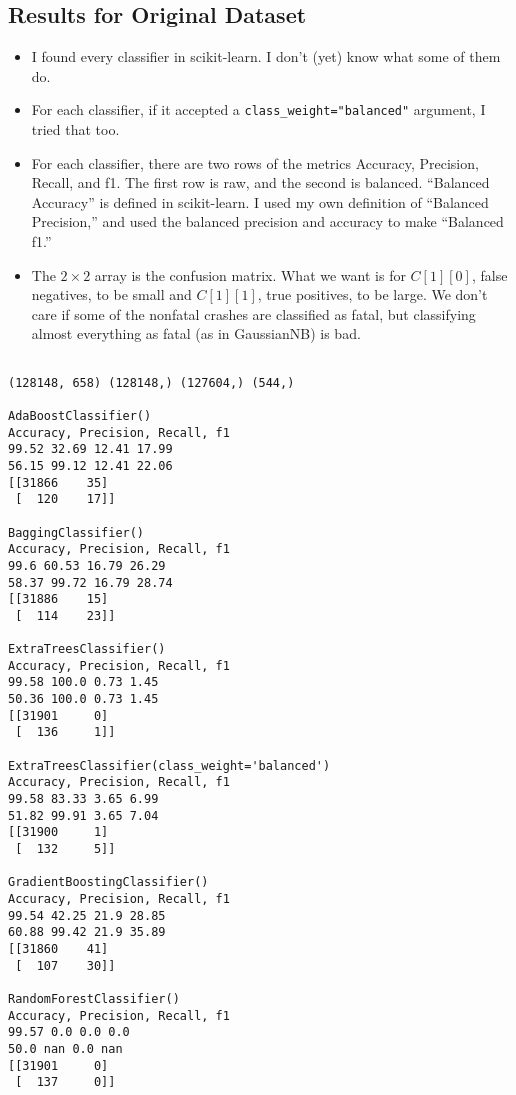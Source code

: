 \documentclass[11pt]{article}
\begin{document}
\begin{spacing}{1.2}
\subsection{Results for Original Dataset}

\begin{itemize}
	\item I found every classifier in scikit-learn.  I don't (yet) know what some of them do.
	\item For each classifier, if it accepted a \verb|class_weight="balanced"| argument, I tried that too.
	\item For each classifier, there are two rows of the metrics Accuracy, Precision, Recall, and f1.  The first row is raw, and the second is balanced.  ``Balanced Accuracy'' is defined in scikit-learn.  I used my own definition of ``Balanced Precision,'' and used the balanced precision and accuracy to make ``Balanced f1.''
	\item The $2\times 2$ array is the confusion matrix.  What we want is for $C[1][0]$, false negatives, to be small and $C[1][1]$, true positives, to be large.  We don't care if some of the nonfatal crashes are classified as fatal, but classifying almost everything as fatal (as in GaussianNB) is bad.  
\end{itemize}

\begin{verbatim}

(128148, 658) (128148,) (127604,) (544,)

AdaBoostClassifier()
Accuracy, Precision, Recall, f1
99.52 32.69 12.41 17.99
56.15 99.12 12.41 22.06
[[31866    35]
 [  120    17]]

BaggingClassifier()
Accuracy, Precision, Recall, f1
99.6 60.53 16.79 26.29
58.37 99.72 16.79 28.74
[[31886    15]
 [  114    23]]

ExtraTreesClassifier()
Accuracy, Precision, Recall, f1
99.58 100.0 0.73 1.45
50.36 100.0 0.73 1.45
[[31901     0]
 [  136     1]]

ExtraTreesClassifier(class_weight='balanced')
Accuracy, Precision, Recall, f1
99.58 83.33 3.65 6.99
51.82 99.91 3.65 7.04
[[31900     1]
 [  132     5]]

GradientBoostingClassifier()
Accuracy, Precision, Recall, f1
99.54 42.25 21.9 28.85
60.88 99.42 21.9 35.89
[[31860    41]
 [  107    30]]

RandomForestClassifier()
Accuracy, Precision, Recall, f1
99.57 0.0 0.0 0.0
50.0 nan 0.0 nan
[[31901     0]
 [  137     0]]


\end{verbatim}
\end{spacing}
\end{document}

